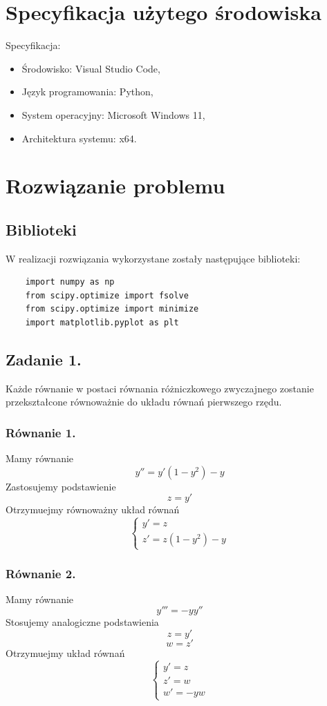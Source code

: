 \documentclass[11pt, leqno]{scrartcl}
\begin{document}
    \section{Specyfikacja użytego środowiska}
    Specyfikacja:
    \begin{itemize}
        \item Środowisko: Visual Studio Code,
        \item Język programowania: Python,
        \item System operacyjny: Microsoft Windows 11,
        \item Architektura systemu: x64.
    \end{itemize}

    \section{Rozwiązanie problemu}
    \subsection{Biblioteki}
    W realizacji rozwiązania wykorzystane zostały następujące
    biblioteki:
    \begin{lstlisting}
    import numpy as np
    from scipy.optimize import fsolve
    from scipy.optimize import minimize
    import matplotlib.pyplot as plt
    \end{lstlisting}

    \subsection{Zadanie 1.}
    Każde równanie w postaci równania różniczkowego zwyczajnego
    zostanie przekształcone równoważnie do układu równań
    pierwszego rzędu.

    \subsubsection{Równanie 1.}
    Mamy równanie
    \[
        y''=y'(1-y^2)-y
    \]
    Zastosujemy podstawienie
    \[
        z=y'
    \]
    Otrzymuejmy równoważny układ równań
    \[
        \begin{cases}
            y'=z \\
            z'=z(1-y^2)-y
        \end{cases}
    \]

    \subsubsection{Równanie 2.}
    Mamy równanie
    \[
        y'''=-yy''
    \]
    Stosujemy analogiczne podstawienia
    \[
        z=y'
    \]
    \[
        w=z'
    \]
    Otrzymuejmy układ równań
    \[
        \begin{cases}
            y'=z \\
            z'=w \\
            w'=-yw
        \end{cases}
    \]
\end{document}
